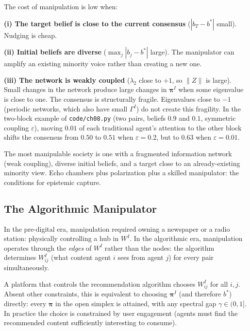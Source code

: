\documentclass[../structural_economics_book.tex]{subfiles}
\begin{document}
\begin{intuition}
The cost of manipulation is low when:

\textbf{(i) The target belief is close to the current consensus} ($|b_T - b^*|$ small). Nudging is cheap.

\textbf{(ii) Initial beliefs are diverse} ($\max_j |b_j - b^*|$ large). The manipulator can amplify an existing minority voice rather than creating a new one.

\textbf{(iii) The network is weakly coupled} ($\lambda_2$ close to $+1$, so $\|Z\|$ is large). Small changes in the network produce large changes in $\boldsymbol{\pi}^I$ when some eigenvalue is close to one. The consensus is structurally fragile. Eigenvalues close to $-1$ (periodic networks, which also have small $\Gamma^I$) do not create this fragility. In the two-block example of \texttt{code/ch08.py} (two pairs, beliefs $0.9$ and $0.1$, symmetric coupling $\varepsilon$), moving $0.01$ of each traditional agent's attention to the other block shifts the consensus from $0.50$ to $0.51$ when $\varepsilon = 0.2$, but to $0.63$ when $\varepsilon = 0.01$.

The most manipulable society is one with a fragmented information network (weak coupling), diverse initial beliefs, and a target close to an already-existing minority view. Echo chambers plus polarization plus a skilled manipulator: the conditions for epistemic capture.
\end{intuition}


\subsection{The Algorithmic Manipulator}

In the pre-digital era, manipulation required owning a newspaper or a radio station: physically controlling a hub in $W^I$. In the algorithmic era, manipulation operates through the \textit{edges} of $W^I$ rather than the nodes: the algorithm determines $W^I_{ij}$ (what content agent $i$ sees from agent $j$) for every pair simultaneously.

\begin{proposition}\label{ch08:prop:algorithm}
A platform that controls the recommendation algorithm chooses $W^I_{ij}$ for all $i, j$. Absent other constraints, this is equivalent to choosing $\boldsymbol{\pi}^I$ (and therefore $b^*$) directly: every $\boldsymbol{\pi}$ in the open simplex is attained, with any spectral gap $\gamma \in (0,1]$. In practice the choice is constrained by user engagement (agents must find the recommended content sufficiently interesting to consume).
\end{proposition}
\end{document}
